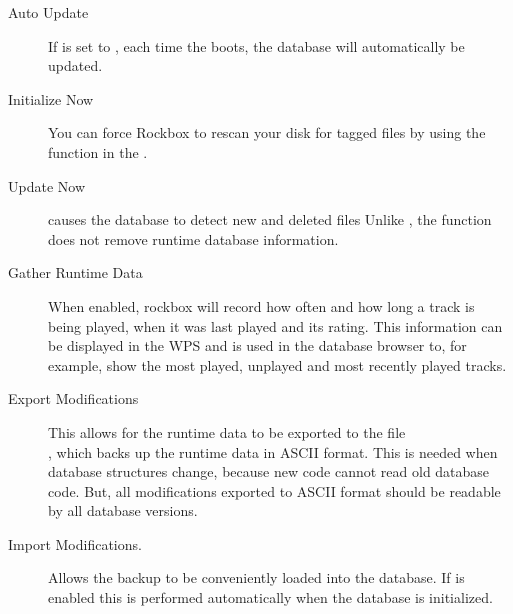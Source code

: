 \begin{description}
  
\item[Auto Update]
  If  is set to , each time the \dap{}
  boots, the database will automatically be updated.

\item[Initialize Now]
  You can force Rockbox to rescan your disk for tagged files by
  using the  function in the .

\item[Update Now]
   causes the database to detect new and deleted files
  Unlike , the  function
  does not remove runtime database information.
  
\item[Gather Runtime Data]
  When enabled, rockbox will record how often and how long a track is being played, 
  when it was last played and its rating. This information can be displayed in
  the WPS and is used in the database browser to, for example, show the most played, 
  unplayed and most recently played tracks.
  
\item[Export Modifications]
  This allows for the runtime data to be exported to the file \\
  , which backs up the runtime data in
  ASCII format. This is needed when database structures change, because new
  code cannot read old database code. But, all modifications
  exported to ASCII format should be readable by all database versions.
  
\item[Import Modifications.]
  Allows the  backup to be 
  conveniently loaded into the database. If  is
  enabled this is performed automatically when the database is initialized.
  
\end{description}

